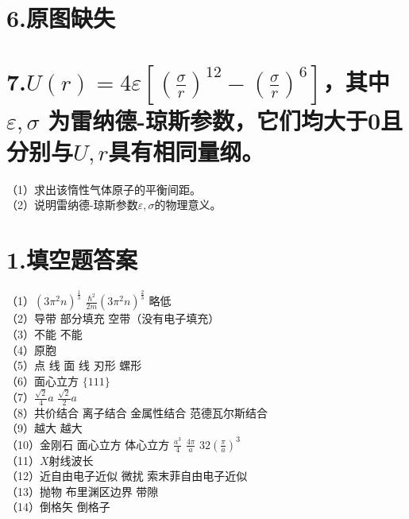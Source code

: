 \documentclass[UTF8]{ctexart}
\begin{document}
\section*{\bfseries 6.原图缺失}
\section*{\bfseries 7.$U(r)=4\varepsilon[(\frac{\sigma}{r})^{12}-(\frac{\sigma}{r})^6]$，其中$\varepsilon,\sigma$
为雷纳德-琼斯参数，它们均大于0且分别与$U,r$具有相同量纲。}
（1）求出该惰性气体原子的平衡间距。\\
（2）说明雷纳德-琼斯参数$\varepsilon,\sigma$的物理意义。\\



\newpage
\section*{\bfseries 1.填空题答案}
（1）$(3\pi^2 n)^{\frac{1}{3}}$ \makebox[2em]{} 
$\frac{\hbar^2}{2m}(3\pi^2 n)^{\frac{2}{3}}$\makebox[2em]{}  
略低\\
（2）导带\makebox[2em]{}  
部分填充\makebox[2em]{}
空带（没有电子填充）\\
（3）不能\makebox[2em]{}
不能\\
（4）原胞\\
（5）点\makebox[2em]{}
线\makebox[2em]{}
面\makebox[2em]{}
线\makebox[2em]{}
刃形\makebox[2em]{}
螺形\\
（6）面心立方\makebox[2em]{}
$\{111\}$\\
（7）$\frac{\sqrt2}{4}a$\makebox[2em]{}
$\frac{\sqrt2}{2}a$\\
（8）共价结合\makebox[2em]{}
离子结合\makebox[2em]{}
金属性结合\makebox[2em]{}
范德瓦尔斯结合\\
（9）越大\makebox[2em]{}
越大\\
（10）金刚石\makebox[2em]{}
面心立方\makebox[2em]{}
体心立方\makebox[2em]{}
$\frac{a^3}{4}$\makebox[2em]{}
$\frac{4\pi}{a}$\makebox[2em]{}
$32(\frac{\pi}{a})^3$\\
（11）$X$射线波长\\
（12）近自由电子近似\makebox[2em]{}
微扰\makebox[2em]{}
索末菲自由电子近似\\
（13）抛物\makebox[2em]{}
布里渊区边界\makebox[2em]{}
带隙\\
（14）倒格矢\makebox[2em]{}
倒格子\\
\end{document}
